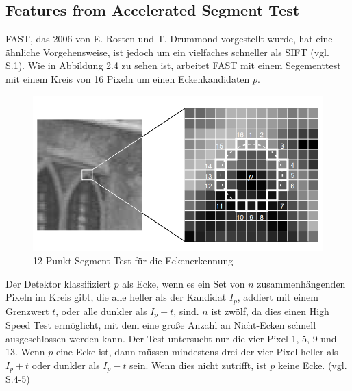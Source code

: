 \subsection{Features from Accelerated Segment Test}
FAST, das 2006 von E. Rosten und T. Drummond vorgestellt wurde, hat eine ähnliche Vorgehensweise, ist jedoch um ein vielfaches schneller als SIFT (vgl. \cite{fast} S.1). Wie in Abbildung 2.4 zu sehen ist, arbeitet FAST mit einem Segementtest mit einem Kreis von 16 Pixeln um einen Eckenkandidaten $p$. 

\begin{figure}[H]
	\centering
	\includegraphics[scale=0.7]{fast.png}
	\caption{12 Punkt Segment Test für die Eckenerkennung \cite{fast}}
\end{figure}

Der Detektor klassifiziert $p$ als Ecke, wenn es ein Set von $n$ zusammenhängenden Pixeln im Kreis gibt, die alle heller als der Kandidat $I_p$, addiert mit einem Grenzwert $t$, oder alle dunkler als $I_p - t$, sind. $n$ ist zwölf, da dies einen High Speed Test ermöglicht, mit dem eine große Anzahl an Nicht-Ecken schnell ausgeschlossen werden kann. Der Test untersucht nur die vier Pixel 1, 5, 9 und 13. Wenn $p$ eine Ecke ist, dann müssen mindestens drei der vier Pixel heller als $I_p + t$ oder dunkler als $I_p - t$  sein. Wenn dies nicht zutrifft, ist $p$ keine Ecke. (vgl. \cite{fast} S.4-5)

